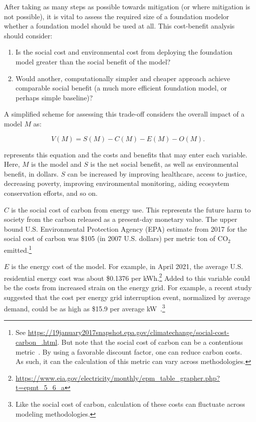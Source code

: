After taking as many steps as possible towards mitigation (or where mitigation is not possible),
it is vital to assess the required size of a foundation model\dash{}or whether a foundation model should be used at all. This cost-benefit analysis should consider:

\begin{enumerate}
    \item Is the social cost and environmental cost from deploying the foundation model greater than the social benefit of the model?
    \item Would another, computationally simpler and cheaper approach achieve comparable social benefit (\eg a much more efficient foundation model, or perhaps simple baseline)?
\end{enumerate}

A simplified scheme for assessing this trade-off considers the overall impact of a model $M$ as:

\begin{equation}
\label{eqn:env}
    V(M) = S(M) - C(M) - E(M) - O(M).
\end{equation}

 represents this equation and the costs and benefits that may enter each variable. Here, $M$ is the model and $S$ is the net social benefit, as well as environmental benefit, in dollars. $S$ can be increased by improving healthcare, access to justice, decreasing poverty, improving environmental monitoring, aiding ecosystem conservation efforts, and so on. 

$C$ is the social cost of carbon from energy use. This represents the future harm to society from the carbon released as a present-day monetary value. The upper bound U.S. Environmental Protection Agency (EPA) estimate from 2017 for the social cost of carbon was \$105 (in 2007 U.S. dollars) per metric ton of $\text{CO}_2$ emitted.\footnote{See \url{https://19january2017snapshot.epa.gov/climatechange/social-cost-carbon_.html}. But note that the social cost of carbon can be a contentious metric~\citep{stern2021social}. By using a favorable discount factor, one can reduce carbon costs. As such, it can the calculation of this metric can vary across methodologies.} 

$E$ is the energy cost of the model. For example, in April 2021, the average U.S. residential energy cost was about \$0.1376 per kWh.\footnote{\url{https://www.eia.gov/electricity/monthly/epm_table_grapher.php?t=epmt_5_6_a}} Added to this variable could be the costs from increased strain on the energy grid. For example, a recent study suggested that the cost per energy grid interruption event, normalized by average demand, could be as high as \$15.9 per average kW~\citep{sullivan_updated_2015}.\footnote{Like the social cost of carbon, calculation of these costs can fluctuate across modeling methodologies.}

